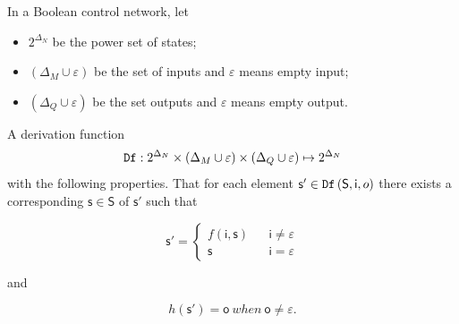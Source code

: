 \begin{definition} 
In a Boolean control network, let
\begin{itemize}
\item $2^{\Delta_N}$ be the power set of states; 
\item $(\Delta_M\cup\varepsilon)$ be the set of inputs and $\varepsilon$ means empty input; 
\item $(\Delta_Q\cup\varepsilon)$ be the set outputs and $\varepsilon$ means empty output.
\end{itemize} 
A derivation function \[{\tt Df}:2^{\Delta_N}\times (\Delta_M\cup\varepsilon) \times (\Delta_Q\cup\varepsilon) \mapsto 2^{\Delta_N}\] 
with the following properties. 
	That for each element $\mathsf{s}'\in {\tt Df}\left(\mathsf{S}, \mathsf{i}, {o}\right)$ there exists a corresponding $\mathsf{s}\in \mathsf{S}$ of $\mathsf{s}'$ such that 
	
\[\mathsf{s}'=\left\{
\begin{array}{rcl}
f( \mathsf{i}, \mathsf{s})      &      & {\mathsf{i}\neq \varepsilon}\\
\mathsf{s}       &      & {\mathsf{i}= \varepsilon}
\end{array} \right. \]

and 

\[h(\mathsf{s}')=\mathsf{o}\ when\ \mathsf{o}\neq \varepsilon.\]

\end{definition}

